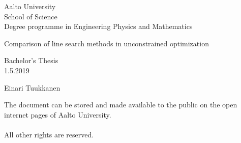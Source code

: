 \documentclass[a4paper,english,titlepage,12pt]{article}
\begin{document}
\ifpdf
{}
\else
{}
\fi

\pagestyle{empty} %

\begin{titlepage}
	Aalto University \\
	School of Science \\
	Degree programme in Engineering Physics and Mathematics \\
	
	\vfill
	
	\begin{center}
		\begin{spacing}{1.75}
		{\LARGE Comparison of line search methods in unconstrained optimization}
		\end{spacing}
		
		Bachelor's Thesis \\
	    1.5.2019

		\vspace{3cm}

		{\large Einari Tuukkanen}

	\end{center}

	\vfill

	The document can be stored and made available to the public on the open internet pages of Aalto University. \\\\
	All other rights are reserved.
\end{titlepage}

%


\tableofcontents
\newpage

\pagestyle{fancy}

\fancyhf{}
\renewcommand{\headrulewidth}{0pt}
\renewcommand{\footrulewidth}{0pt}

\rhead{\footnotesize \thepage} 

\thispagestyle{empty} 
\end{document}
